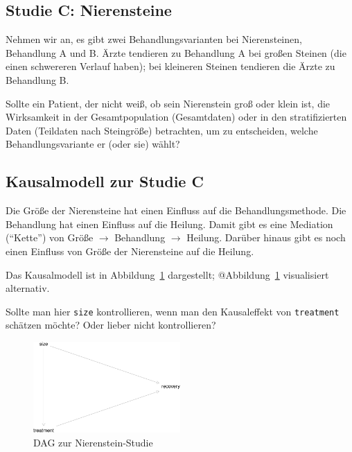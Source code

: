 \documentclass[
  a4paper,
  DIV=11]{scrreprt}
\theoremstyle{definition}
\theoremstyle{remark}
\begin{document}
\hypertarget{studie-c-nierensteine}{%
\subsection{Studie C: Nierensteine}\label{studie-c-nierensteine}}

Nehmen wir an, es gibt zwei Behandlungsvarianten bei Nierensteinen,
Behandlung A und B. Ärzte tendieren zu Behandlung A bei großen Steinen
(die einen schwereren Verlauf haben); bei kleineren Steinen tendieren
die Ärzte zu Behandlung B.

Sollte ein Patient, der nicht weiß, ob sein Nierenstein groß oder klein
ist, die Wirksamkeit in der Gesamtpopulation (Gesamtdaten) oder in den
stratiﬁzierten Daten (Teildaten nach Steingröße) betrachten, um zu
entscheiden, welche Behandlungsvariante er (oder sie) wählt?

\hypertarget{kausalmodell-zur-studie-c}{%
\subsection{Kausalmodell zur Studie C}\label{kausalmodell-zur-studie-c}}

Die Größe der Nierensteine hat einen Einfluss auf die
Behandlungsmethode. Die Behandlung hat einen Einfluss auf die Heilung.
Damit gibt es eine Mediation (``Kette'') von Größe \(\rightarrow\)
Behandlung \(\rightarrow\) Heilung. Darüber hinaus gibt es noch einen
Einfluss von Größe der Nierensteine auf die Heilung.

Das Kausalmodell ist in Abbildung~\ref{fig-dag-studie-c} dargestellt;
@Abbildung~\ref{fig-dag-studie-c} visualisiert alternativ.

Sollte man hier \texttt{size} kontrollieren, wenn man den Kausaleffekt
von \texttt{treatment} schätzen möchte? Oder lieber nicht kontrollieren?

\begin{figure}

{\centering \includegraphics[width=0.5\textwidth,height=\textheight]{./kausal_files/figure-pdf/fig-dag-studie-c-1.pdf}

}

\caption{\label{fig-dag-studie-c}DAG zur Nierenstein-Studie}

\end{figure}
\end{document}
